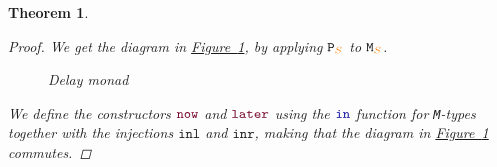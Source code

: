 \documentclass[twoside,11pt,openright]{report}
\theoremstyle{plain} %
\newtheorem{thm}{Theorem}[section]
\theoremstyle{definition}
\theoremstyle{remark}
\newcommand*{\figref}[1]{\hyperref[fig:#1]{Figure~\ref*{fig:#1}}}
\newcommand*{\type}[1]{\textcolor{magenta!90!black}{#1}}
\newcommand*{\container}[1]{\textcolor{orange}{#1}}
\newcommand*{\function}[1]{\textcolor{blue!60!black}{\ensuremath{\mathtt{#1}}}}
\newcommand*{\constructor}[1]{\textcolor{purple!60!black}{\ensuremath{\mathtt{#1}}}}
\newcommand*{\typeformer}[1]{\ensuremath{\mathtt{#1}}}
\newcommand*{\functor}[1]{\ensuremath{\mathbf{\mathtt{#1}}}}
\begin{document}
\begin{thm}
\begin{proof}
    We get the diagram in \figref{delay-monad}, by applying \(\functor{P}_{\container{S}}\) to \(\typeformer{M}_{\container{S}}\).
    \begin{figure}[h]
      \centering
      \caption{Delay monad}
      \label{fig:delay-monad}
    \end{figure}
    \noindent We define the constructors \(\constructor{now}\) and \(\constructor{later}\) using the \(\function{in}\) function for \texttt{M}-types together with the injections \(\mathtt{inl}\) and \(\mathtt{inr}\), making that the diagram in \figref{delay-monad} commutes.
  \end{proof}
\end{thm}
\end{document}
